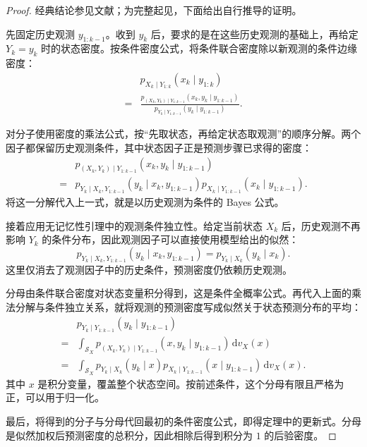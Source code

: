 \begin{proof}
经典结论参见文献\cite{sarkka2013bayesian,cappe2005inference}；为完整起见，下面给出自行推导的证明。

先固定历史观测 $y_{1:k-1}$。收到 $y_k$ 后，要求的是在这些历史观测的基础上，再给定 $Y_k=y_k$ 时的状态密度。按条件密度公式，将条件联合密度除以新观测的条件边缘密度：
\begin{equation}\label{cw:eq:16}
\begin{aligned}
&p_{X_k\mid Y_{1:k}}(x_k\mid y_{1:k})\\
= &\frac{p_{(X_k,Y_k)\mid Y_{1:k-1}}(x_k,y_k\mid y_{1:k-1})}
{p_{Y_k\mid Y_{1:k-1}}(y_k\mid y_{1:k-1})}.
\end{aligned}
\end{equation}

对分子使用密度的乘法公式，按“先取状态，再给定状态取观测”的顺序分解。两个因子都保留历史观测条件，其中状态因子正是预测步骤已求得的密度：
\begin{equation}\label{cw:eq:17}
\begin{aligned}
&p_{(X_k,Y_k)\mid Y_{1:k-1}}(x_k,y_k\mid y_{1:k-1})\\
= &p_{Y_k\mid X_k,Y_{1:k-1}}(y_k\mid x_k,y_{1:k-1})
p_{X_k\mid Y_{1:k-1}}(x_k\mid y_{1:k-1}).
\end{aligned}
\end{equation}
将这一分解代入上一式，就是以历史观测为条件的 Bayes 公式。

接着应用无记忆性引理中的观测条件独立性。给定当前状态 $X_k$ 后，历史观测不再影响 $Y_k$ 的条件分布，因此观测因子可以直接使用模型给出的似然：
\begin{equation}\label{cw:eq:18}
p_{Y_k\mid X_k,Y_{1:k-1}}(y_k\mid x_k,y_{1:k-1})
=p_{Y_k\mid X_k}(y_k\mid x_k).
\end{equation}
这里仅消去了观测因子中的历史条件，预测密度仍依赖历史观测。

分母由条件联合密度对状态变量积分得到，这是条件全概率公式。再代入上面的乘法分解与条件独立关系，就将观测的预测密度写成似然关于状态预测分布的平均：
\begin{equation}\label{cw:eq:19}
\begin{aligned}
&p_{Y_k\mid Y_{1:k-1}}(y_k\mid y_{1:k-1})\\
= &\int_{\mathcal{S}_X}p_{(X_k,Y_k)\mid Y_{1:k-1}}(x,y_k\mid y_{1:k-1})\,\mathrm{d}v_X(x)\\
= &\int_{\mathcal{S}_X}p_{Y_k\mid X_k}(y_k\mid x)
p_{X_k\mid Y_{1:k-1}}(x\mid y_{1:k-1})\,\mathrm{d}v_X(x).
\end{aligned}
\end{equation}
其中 $x$ 是积分变量，覆盖整个状态空间。按前述条件，这个分母有限且严格为正，可以用于归一化。

最后，将得到的分子与分母代回最初的条件密度公式，即得定理中的更新式。分母是似然加权后预测密度的总积分，因此相除后得到积分为 $1$ 的后验密度。
\end{proof}
